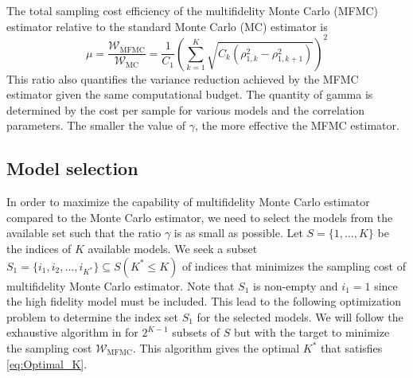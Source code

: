 \documentclass[final,3p,times,11pt]{elsarticle}
\begin{document}
The total sampling cost efficiency of the multifidelity Monte Carlo (MFMC) estimator relative to the standard Monte Carlo (MC) estimator is
\[
\mu = \frac{\mathcal{W}_\text{MFMC}}{\mathcal{W}_\text{MC}} = \frac{1}{C_1} \left(\sum_{k=1}^K\sqrt{C_k\left(\rho_{1,k}^2 - \rho_{1,k+1}^2\right)}\right)^2
\]
This ratio also quantifies the variance reduction achieved by the MFMC estimator given the same computational budget. The quantity of gamma is determined by the cost per sample for various models and the correlation parameters. The smaller the value of $\gamma$, the more effective the MFMC estimator.



\subsection{Model selection}
In order to maximize the capability of multifidelity Monte Carlo estimator  compared to the Monte Carlo estimator, we need to select the models from the available set such that the ratio $\gamma$ is as small as possible. Let $S=\{1, \ldots, K\}$ be the indices of $K$ available models. We seek a subset $S_1=\{i_1,i_2, \ldots,i_{K^*}\}\subseteq S (K^*\le K)$ of indices that minimizes the sampling cost of multifidelity Monte Carlo estimator. Note that $S_1$ is non-empty and $i_1=1$ since the high fidelity model must be included. This lead to the following optimization problem to determine the index set $S_1$ for the selected models. We will follow the exhaustive algorithm in \cite[Algorithm~1]{PeWiGu:2016} for $2^{K-1}$ subsets of $S$ but with the target to minimize the sampling cost $\mathcal{W}_\text{MFMC}$. This algorithm gives the optimal $K^*$ that satisfies \eqref{eq:Optimal_K}.
\end{document}
